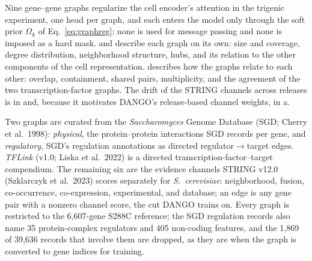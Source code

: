 \clearpage
{}

Nine gene--gene graphs regularize the cell encoder's attention in the trigenic experiment, one
head per graph, and each enters the model only through the soft prior $\Omega_k$ of
Eq.~\ref{eq:graphreg}: none is used for message passing and none is imposed as a hard mask.
 and  describe each graph on its own: size and
coverage, degree distribution, neighborhood structure, hubs, and its relation to the other
components of the cell representation.  describes how the graphs
relate to each other: overlap, containment, shared pairs, multiplicity, and the agreement of the
two transcription-factor graphs. The drift of the STRING channels across releases is in
 and, because it motivates DANGO's release-based channel weights, in
a.

 Two graphs are curated from the \emph{Saccharomyces} Genome Database (SGD;
Cherry et al.\ 1998): \emph{physical}, the protein--protein interactions SGD records per gene,
and \emph{regulatory}, SGD's regulation annotations as directed regulator$\to$target edges.
\emph{TFLink} (v1.0; Liska et al.\ 2022) is a directed transcription-factor--target compendium.
The remaining six are the evidence channels STRING v12.0 (Szklarczyk et al.\ 2023) scores
separately for \emph{S.\ cerevisiae}: neighborhood, fusion, co-occurrence, co-expression,
experimental, and database; an edge is any gene pair with a nonzero channel score, the cut
DANGO trains on. Every graph is restricted to the 6,607-gene S288C reference; the SGD
regulation records also name 35 protein-complex regulators and 405 non-coding features, and the
1,869 of 39,636 records that involve them are dropped, as they are when the graph is converted to
gene indices for training.

